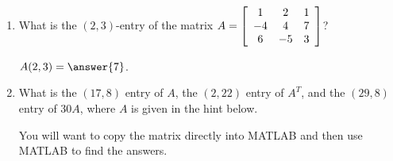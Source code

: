 \documentclass{ximera}
\author{Zack Reed}
\begin{document}
\begin{exercise}
  \begin{enumerate}
  \item What is the $(2,3)$-entry of the matrix $A=\startmat{ccc}
    1 & 2 & 1 \\
    -4 & 4 & 7 \\
    6 & -5 & 3
  \stopmat$?

  $A(2,3)=\answer{7}$.


  \item What is the $(17,8)$ entry of $A$, the $(2,22)$ entry of $A^T$, and the $(29,8)$ entry of $30A$, where $A$ is given in the hint below. 
  
  You will want to copy the matrix directly into MATLAB and then use MATLAB to find the answers.

  \begin{hint}


\end{hint}
\end{enumerate}
\end{exercise}
\end{document}
